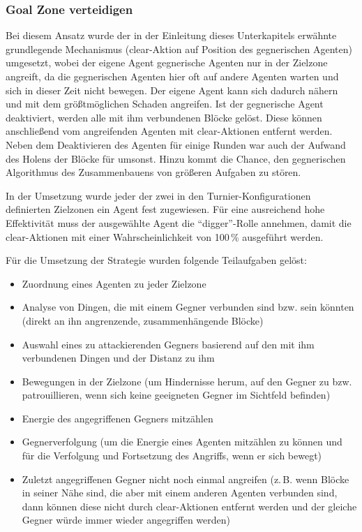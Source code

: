 \documentclass[runningheads]{llncs}
\begin{document}
\subsubsection{Goal Zone verteidigen}
Bei diesem Ansatz wurde der in der Einleitung dieses Unterkapitels erwähnte grundlegende Mechanismus (clear-Aktion auf Position des gegnerischen Agenten) umgesetzt, wobei der eigene Agent gegnerische Agenten nur in der Zielzone angreift, da die gegnerischen Agenten hier oft auf andere Agenten warten und sich in dieser Zeit nicht bewegen. Der eigene Agent kann sich dadurch nähern und mit dem größtmöglichen Schaden angreifen. Ist der gegnerische Agent deaktiviert, werden alle mit ihm verbundenen Blöcke gelöst. Diese können anschließend vom angreifenden Agenten mit clear-Aktionen entfernt werden. Neben dem Deaktivieren des Agenten für einige Runden war auch der Aufwand des Holens der Blöcke für umsonst. Hinzu kommt die Chance, den gegnerischen Algorithmus des Zusammenbauens von größeren Aufgaben zu stören.

In der Umsetzung wurde jeder der zwei in den Turnier-Konfigurationen definierten Zielzonen ein Agent fest zugewiesen. Für eine ausreichend hohe Effektivität muss der ausgewählte Agent die "`digger"'-Rolle annehmen, damit die clear-Aktionen mit einer Wahrscheinlichkeit von 100\,\% ausgeführt werden.

Für die Umsetzung der Strategie wurden folgende Teilaufgaben gelöst:
\begin{itemize}
\item{Zuordnung eines Agenten zu jeder Zielzone}
\item{Analyse von Dingen, die mit einem Gegner verbunden sind bzw. sein könnten (direkt an ihn angrenzende, zusammenhängende Blöcke)}
\item{Auswahl eines zu attackierenden Gegners basierend auf den mit ihm verbundenen Dingen und der Distanz zu ihm}
\item{Bewegungen in der Zielzone (um Hindernisse herum, auf den Gegner zu bzw. patrouillieren, wenn sich keine geeigneten Gegner im Sichtfeld befinden)}
\item{Energie des angegriffenen Gegners mitzählen}
\item{Gegnerverfolgung (um die Energie eines Agenten mitzählen zu können und für die Verfolgung und Fortsetzung des Angriffs, wenn er sich bewegt)}
\item{Zuletzt angegriffenen Gegner nicht noch einmal angreifen (z.\,B. wenn Blöcke in seiner Nähe sind, die aber mit einem anderen Agenten verbunden sind, dann können diese nicht durch clear-Aktionen entfernt werden und der gleiche Gegner würde immer wieder angegriffen werden)}
\end{itemize}
\end{document}
